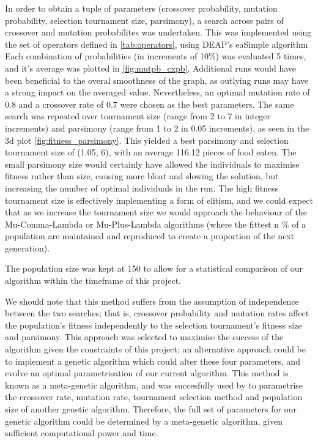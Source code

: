 \documentclass[british,10pt,a4paper]{article}
\begin{document}
In order to obtain a tuple of parameters (crossover probability, mutation probability, selection tournament size, parsimony), a search across pairs of crossover and mutation probabilites was undertaken. This was implemented using the set of operators defined in \autoref{tab:operators}, using DEAP's eaSimple algorithm Each combination of probabilities (in increments of 10\%) was evaluated 5 times, and it's average was plotted in \autoref{fig:mutpb_cxpb}. Additional runs would have been beneficial to the overal smoothness of the graph, as outlying runs may have a strong impact on the averaged value. Nevertheless, an optimal mutation rate of 0.8 and a crossover rate of 0.7 were chosen as the best parameters. The same search was repeated over tournament size (range from 2 to 7 in integer increments) and parsimony (range from 1 to 2 in 0.05 increments), as seen in the 3d plot \autoref{fig:fitness_parsimony}. This yielded a best parsimony and selection tournament size of (1.05, 6), with an average 116.12 pieces of food eaten. The small parsimony size would certainly have allowed the individuals to maximise fitness rather than size, causing more bloat and slowing the solution, but increasing the number of optimal individuals in the run. The high fitness tournament size is effectively implementing a form of elitism, and we could expect that as we increase the tournament size we would approach the behaviour of the Mu-Comma-Lambda or Mu-Plus-Lambda algorithms (where the fittest n \% of a population are maintained and reproduced to create a proportion of the next generation).\newline

The population size was kept at 150 to allow for a statistical comparison of our algorithm within the timeframe of this project.

We should note that this method suffers from the assumption of independence between the two searches; that is, crossover probability and mutation rates affect the population's fitness independently to the selection tournament's fitness size and parsimony. This approach was selected to maximise the success of the algorithm given the constraints of this project; an alternative approach could be to implement a genetic algorithm which could alter these four parameters, and evolve an optimal parametrisation of our current algorithm. This method is known as a meta-genetic algorithm, and was succesfully used by \citet{Brain2011-pz} to parametrise the crossover rate, mutation rate, tournament selection method and population size of another genetic algorithm. Therefore, the full set of parameters for our genetic algorithm could be determined by a meta-genetic algorithm, given sufficient computational power and time.\newline
\end{document}
